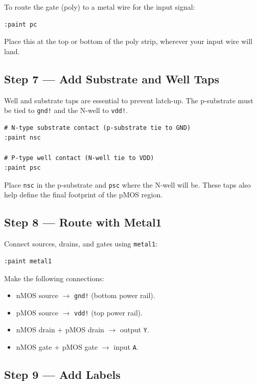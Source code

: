 \documentclass[11pt]{article}
\begin{document}
To route the gate (poly) to a metal wire for the input signal:

\begin{lstlisting}
:paint pc
\end{lstlisting}

Place this at the top or bottom of the poly strip, wherever your input
wire will land.

\subsection{Step 7 --- Add Substrate and Well Taps}

Well and substrate taps are essential to prevent latch-up.
The p-substrate must be tied to \texttt{gnd!} and the N-well to
\texttt{vdd!}.

\begin{lstlisting}
# N-type substrate contact (p-substrate tie to GND)
:paint nsc

# P-type well contact (N-well tie to VDD)
:paint psc
\end{lstlisting}

Place \texttt{nsc} in the p-substrate and \texttt{psc} where the N-well
will be.
These taps also help define the final footprint of the pMOS region.

\subsection{Step 8 --- Route with Metal1}

Connect sources, drains, and gates using \texttt{metal1}:

\begin{lstlisting}
:paint metal1
\end{lstlisting}

Make the following connections:

\begin{itemize}[leftmargin=2em]
  \item nMOS source $\rightarrow$ \texttt{gnd!} (bottom power rail).
  \item pMOS source $\rightarrow$ \texttt{vdd!} (top power rail).
  \item nMOS drain + pMOS drain $\rightarrow$ output \texttt{Y}.
  \item nMOS gate + pMOS gate $\rightarrow$ input \texttt{A}.
\end{itemize}

\subsection{Step 9 --- Add Labels}
\end{document}
